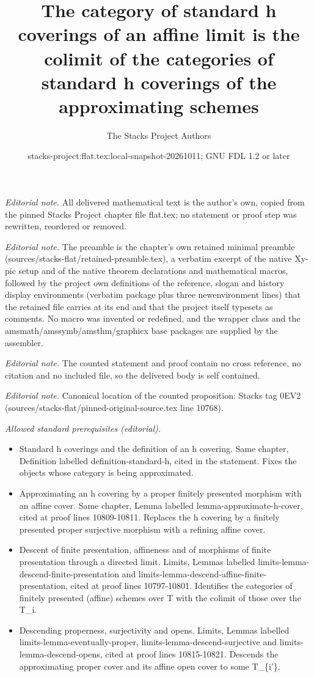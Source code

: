 \documentclass[10pt,a4paper]{amsart}
\title{The category of standard h coverings of an affine limit is the colimit of the categories of standard h coverings of the approximating schemes}
\author{The Stacks Project Authors}
\date{stacks-project:flat.tex:local-snapshot-20261011; GNU FDL 1.2 or later}
\theoremstyle{plain}
\theoremstyle{definition}
\theoremstyle{remark}
\numberwithin{equation}{subsection}
\begin{document}
\maketitle
\noindent\textit{Editorial note.} All delivered mathematical text is the author's own, copied from the pinned Stacks Project chapter file flat.tex; no statement or proof step was rewritten, reordered or removed.\par\medskip
\noindent\textit{Editorial note.} The preamble is the chapter's own retained minimal preamble (sources/stacks-flat/retained-preamble.tex), a verbatim excerpt of the native Xy-pic setup and of the native theorem declarations and mathematical macros, followed by the project own definitions of the reference, slogan and history display environments (verbatim package plus three newenvironment lines) that the retained file carries at its end and that the project itself typesets as comments. No macro was invented or redefined, and the wrapper class and the amsmath/amssymb/amsthm/graphicx base packages are supplied by the assembler.\par\medskip
\noindent\textit{Editorial note.} The counted statement and proof contain no cross reference, no citation and no included file, so the delivered body is self contained.\par\medskip
\noindent\textit{Editorial note.} Canonical location of the counted proposition: Stacks tag 0EV2 (sources/stacks-flat/pinned-original-source.tex line 10768).\par\medskip
\noindent\textit{Allowed standard prerequisites (editorial).}\begin{itemize}
\item Standard h coverings and the definition of an h covering. Same chapter, Definition labelled definition-standard-h, cited in the statement. Fixes the objects whose category is being approximated.
\item Approximating an h covering by a proper finitely presented morphism with an affine cover. Same chapter, Lemma labelled lemma-approximate-h-cover, cited at proof lines 10809-10811. Replaces the h covering by a finitely presented proper surjective morphism with a refining affine cover.
\item Descent of finite presentation, affineness and of morphisms of finite presentation through a directed limit. Limits, Lemmas labelled limits-lemma-descend-finite-presentation and limits-lemma-descend-affine-finite-presentation, cited at proof lines 10797-10801. Identifies the categories of finitely presented (affine) schemes over T with the colimit of those over the T\_i.
\item Descending properness, surjectivity and opens. Limits, Lemmas labelled limits-lemma-eventually-proper, limits-lemma-descend-surjective and limits-lemma-descend-opens, cited at proof lines 10815-10821. Descends the approximating proper cover and its affine open cover to some T\_\{i'\}.
\end{itemize}\medskip
\end{document}
